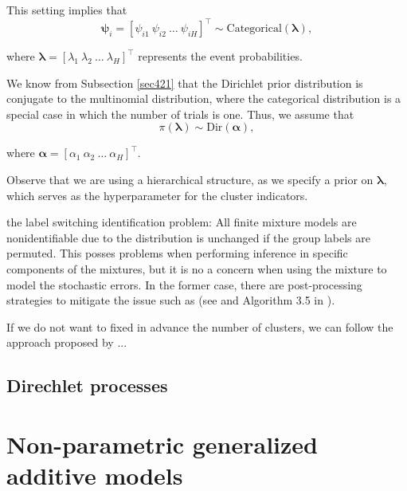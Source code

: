 This setting implies that  
\[
\bm{\psi}_i = [\psi_{i1} \  \psi_{i2} \ \dots \ \psi_{iH}]^{\top} \sim \text{Categorical}(\bm{\lambda}),
\] 
  
where \( \bm{\lambda} = [\lambda_1 \  \lambda_2 \  \dots \ \lambda_H]^{\top} \) represents the event probabilities.

We know from Subsection \ref{sec421} that the Dirichlet prior distribution is conjugate to the multinomial distribution, where the categorical distribution is a special case in which the number of trials is one. Thus, we assume that  
\[
\pi(\bm{\lambda}) \sim \text{Dir}(\bm{\alpha}),
\]  

where \( \bm{\alpha} = [\alpha_1 \ \alpha_2 \ \dots \ \alpha_H]^{\top} \).  

Observe that we are using a hierarchical structure, as we specify a prior on \( \bm{\lambda} \), which serves as the hyperparameter for the cluster indicators.
 

the label switching identification problem: All finite mixture models are nonidentifiable due to the distribution is unchanged if the group labels are permuted. This posses problems when performing inference in specific components of the mixtures, but it is no a concern when using the mixture to model the stochastic errors. In the former case, there are post-processing strategies to mitigate the issue such as  (see \cite[p.~534]{gelman2021bayesian} and Algorithm 3.5 in \cite[p.~82]{fruhwirth2006finite}).

If we do not want to fixed in advance the number of clusters, we can follow the approach proposed by \cite[p.~536]{gelman2021bayesian}  ... 

\subsection{Direchlet processes}\label{sec11_12}

\section{Non-parametric generalized additive models}\label{sec11_2}

